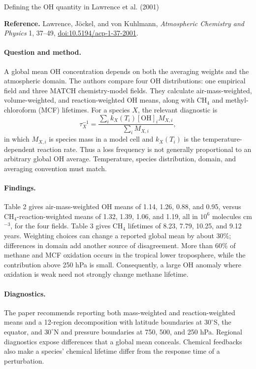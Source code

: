 \documentclass[11pt]{article}
\begin{document}
\begin{center}\large Defining the OH quantity in Lawrence et al. (2001)\end{center}
\noindent\textbf{Reference.} Lawrence, J\"ockel, and von Kuhlmann,
\emph{Atmospheric Chemistry and Physics} 1, 37--49,
\href{https://doi.org/10.5194/acp-1-37-2001}{doi:10.5194/acp-1-37-2001}.

\paragraph{Question and method.} A global mean OH concentration depends on both
the averaging weights and the atmospheric domain. The authors compare four OH
distributions: one empirical field and three MATCH chemistry-model fields.
They calculate air-mass-weighted, volume-weighted, and reaction-weighted OH
means, along with CH$_4$ and methyl-chloroform (MCF) lifetimes. For a species
$X$, the relevant diagnostic is
\begin{equation}
\tau_X^{-1}=\frac{\sum_i k_X(T_i)[\mathrm{OH}]_i M_{X,i}}
{\sum_i M_{X,i}},
\end{equation}
in which $M_{X,i}$ is species mass in a model cell and $k_X(T_i)$ is the
temperature-dependent reaction rate. Thus a loss frequency is not generally
proportional to an arbitrary global OH average. Temperature, species distribution,
domain, and averaging convention must match.

\paragraph{Findings.} Table 2 gives air-mass-weighted OH means of 1.14, 1.26,
0.88, and 0.95, versus CH$_4$-reaction-weighted means of 1.32, 1.39, 1.06, and
1.19, all in $10^6$ molecules cm$^{-3}$, for the four fields. Table 3 gives
CH$_4$ lifetimes of 8.23, 7.79, 10.25, and 9.12 years. Weighting choices can
change a reported global mean by about 30\%; differences in domain add another
source of disagreement. More than 60\% of methane and MCF oxidation occurs
in the tropical lower troposphere, while the contribution above 250 hPa is small.
Consequently, a large OH anomaly where oxidation is weak need not strongly
change methane lifetime.

\paragraph{Diagnostics.} The paper recommends reporting both
mass-weighted and reaction-weighted means and a 12-region decomposition with
latitude boundaries at $30^\circ$S, the equator, and $30^\circ$N and pressure
boundaries at 750, 500, and 250 hPa. Regional diagnostics expose differences
that a global mean conceals. Chemical feedbacks also make a species'
chemical lifetime differ from the response time of a perturbation.
\end{document}

